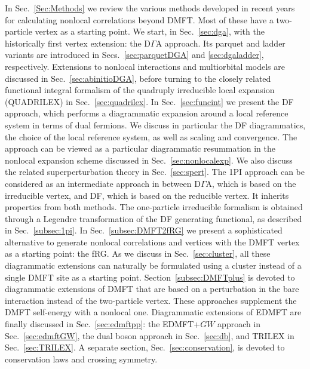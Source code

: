 \documentclass[rmp,aps,reprint,amsmath,amssymb,superscriptaddress,showpacs,nofootinbib]{revtex4-1}
\begin{document}
In Sec.~\ref{Sec:Methods} we review the various methods developed in recent years for calculating nonlocal correlations beyond DMFT. Most of these have a two-particle vertex as a starting point.  We start, in Sec.~\ref{sec:dga}, with the historically first vertex extension: the D$\Gamma$A approach. Its parquet and ladder variants are introduced in Secs.~\ref{sec:parquetDGA} and \ref{sec:dgaladder}, respectively. Extensions to nonlocal interactions and multiorbital models are discussed in Sec.~\ref{sec:abinitioDGA}, before turning to the closely related  functional integral formalism of the quadruply irreducible local expansion (QUADRILEX) in Sec.~\ref{sec:quadrilex}. In Sec.~\ref{sec:funcint} we present the DF approach, which performs a diagrammatic expansion around a local reference system in terms of dual fermions. We discuss in particular the DF diagrammatics, the choice of the local reference system, as well as scaling and convergence. The approach can be viewed as a particular diagrammatic resummation in the nonlocal expansion scheme discussed in Sec.~\ref{sec:nonlocalexp}. We also discuss  the related superperturbation theory in Sec.~\ref{sec:spert}. The 1PI approach can be considered as an intermediate approach in between D$\Gamma$A, which is based on the irreducible vertex, and DF, which is based on the reducible vertex. It inherits properties from both methods. The one-particle irreducible formalism is obtained through a Legendre transformation of the DF generating functional, as described in Sec.~\ref{subsec:1pi}. In Sec.~\ref{subsec:DMFT2fRG} we present a sophisticated alternative to generate nonlocal correlations and vertices with the DMFT vertex as a starting point: the fRG. As we discuss in Sec.~\ref{sec:cluster}, all these diagrammatic extensions can naturally be formulated using a cluster instead of a single DMFT site as a starting point. Section~\ref{subsec:DMFTplus} is devoted to diagrammatic extensions of DMFT that are based on a perturbation in the bare interaction instead of the two-particle vertex. These approaches supplement the DMFT self-energy with a nonlocal one. Diagrammatic extensions of EDMFT are finally discussed in Sec.~\ref{sec:edmftpp}: the EDMFT+$GW$ approach in Sec.~\ref{sec:edmftGW}, the dual boson approach in Sec.~\ref{sec:db}, and TRILEX in Sec.~\ref{sec:TRILEX}. A separate section, Sec.~\ref{sec:conservation}, is devoted to conservation laws  and crossing symmetry.
\end{document}
